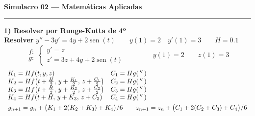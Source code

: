\documentclass[11pt]{article}
\DeclareMathOperator{\sen}{sen}
\begin{document}
\begin{center}{\Large\textbf{Simulacro 02 --- Matemáticas Aplicadas}}\end{center}
\hrule\vspace{8pt}

{\large\textbf{1) Resolver por Runge-Kutta de 4º}}\\[6pt]
\textbf{Resolver} \quad $y''-3y'=4y+2\sen(t) \qquad y(1)=2 \quad y'(1)=3 \qquad H=0.1$\\[4pt]
\[
\begin{array}{r} f:\\[2pt] g:\end{array}\left\{\begin{array}{l} y'=z\\[2pt] z'=3z+4y+2\sen(t)\end{array}\right.
\qquad\qquad y(1)=2 \qquad z(1)=3
\]
\[
\begin{array}{ll}
K_1=Hf(t,y,z) & C_1=Hg(\,''\,)\\
K_2=Hf\!\left(t+\frac{H}{2},\,y+\frac{K_1}{2},\,z+\frac{C_1}{2}\right) & C_2=Hg(\,''\,)\\
K_3=Hf\!\left(t+\frac{H}{2},\,y+\frac{K_2}{2},\,z+\frac{C_2}{2}\right) & C_3=Hg(\,''\,)\\
K_4=Hf(t+H,\,y+K_3,\,z+C_3) & C_4=Hg(\,''\,)\\[4pt]
\multicolumn{2}{l}{y_{n+1}=y_n+\big(K_1+2(K_2+K_3)+K_4\big)/6 \qquad z_{n+1}=z_n+\big(C_1+2(C_2+C_3)+C_4\big)/6}
\end{array}
\]
\end{document}
